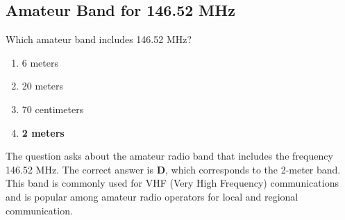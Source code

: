 \subsection{Amateur Band for 146.52 MHz}
\label{T1B04}

\begin{tcolorbox}[colback=gray!10!white,colframe=black!75!black,title=T1B04]
Which amateur band includes 146.52 MHz?
\begin{enumerate}[label=\Alph*,noitemsep]
    \item 6 meters
    \item 20 meters
    \item 70 centimeters
    \item \textbf{2 meters}
\end{enumerate}
\end{tcolorbox}

The question asks about the amateur radio band that includes the frequency 146.52 MHz. The correct answer is \textbf{D}, which corresponds to the 2-meter band. This band is commonly used for VHF (Very High Frequency) communications and is popular among amateur radio operators for local and regional communication.